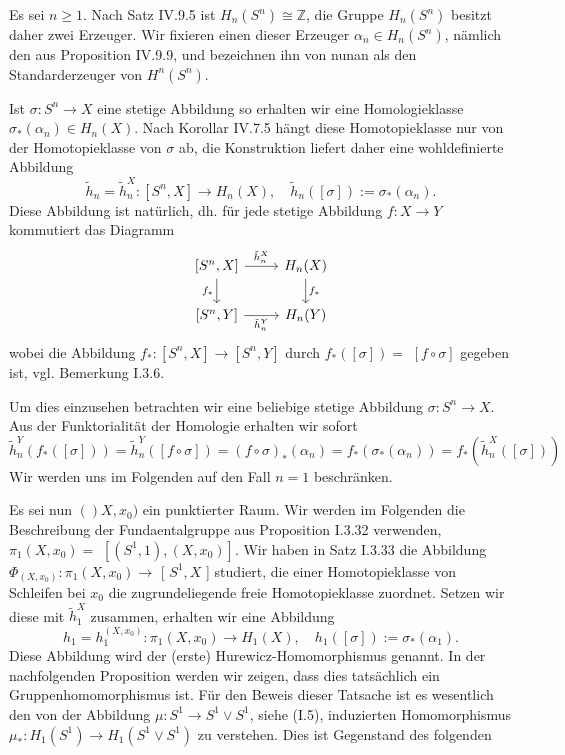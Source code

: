 \documentclass[10pt, letterpaper]{article}
\begin{document}
Es sei $n \geq 1$. Nach Satz IV.9.5 ist $H_n\left(S^n\right) \cong \mathbb{Z}$, die Gruppe $H_n\left(S^n\right)$ besitzt daher zwei Erzeuger. Wir fixieren einen dieser Erzeuger $\alpha_n \in H_n\left(S^n\right)$, nämlich den aus Proposition IV.9.9, und bezeichnen ihn von nunan als den Standarderzeuger von $H^n\left(S^n\right)$.

Ist $\sigma: S^n \rightarrow X$ eine stetige Abbildung so erhalten wir eine Homologieklasse $\sigma_*\left(\alpha_n\right) \in H_n(X)$. Nach Korollar IV.7.5 hängt diese Homotopieklasse nur von der Homotopieklasse von $\sigma$ ab, die Konstruktion liefert daher eine wohldefinierte Abbildung
$$
\tilde{h}_n=\tilde{h}_n^X:\left[S^n, X\right] \rightarrow H_n(X), \quad \tilde{h}_n([\sigma]):=\sigma_*\left(\alpha_n\right) .
$$
Diese Abbildung ist natürlich, dh. für jede stetige Abbildung $f: X \rightarrow Y$ kommutiert das Diagramm
\[
\begin{tikzcd}
{[S^n, X]} \arrow[r, "\tilde{h}_n^X"] \arrow[d, "f_*"'] & H_n(X) \arrow[d, "f_*"] \\
{[S^n, Y]} \arrow[r, "\tilde{h}_n^Y"'] & H_n(Y)
\end{tikzcd}
\]
wobei die Abbildung $f_*:\left[S^n, X\right] \rightarrow\left[S^n, Y\right]$ durch $f_*([\sigma])=$ $[f \circ \sigma]$ gegeben ist, vgl. Bemerkung I.3.6. 

Um dies einzusehen betrachten wir eine beliebige stetige Abbildung $\sigma: S^n \rightarrow X$. Aus der Funktorialität der Homologie erhalten wir sofort 
$$\tilde{h}_n^Y\left(f_*([\sigma])\right)=\tilde{h}_n^Y([f \circ \sigma])=(f \circ \sigma)_*\left(\alpha_n\right)=f_*\left(\sigma_*\left(\alpha_n\right)\right)=f_*\left(\tilde{h}_n^X([\sigma])\right)$$ 
Wir werden uns im Folgenden auf den Fall $n=1$ beschränken.

Es sei nun $()X, x_0)$ ein punktierter Raum. Wir werden im Folgenden die Beschreibung der Fundaentalgruppe aus Proposition I.3.32 verwenden, $\pi_1\left(X, x_0\right)=$ $\left[\left(S^1, 1\right),\left(X, x_0\right)\right]$. Wir haben in Satz I.3.33 die Abbildung $\Phi_{\left(X, x_0\right)}: \pi_1\left(X, x_0\right) \rightarrow$ [ $S^1, X$ ] studiert, die einer Homotopieklasse von Schleifen bei $x_0$ die zugrundeliegende freie Homotopieklasse zuordnet. Setzen wir diese mit $\tilde{h}_1^X$ zusammen, erhalten wir eine Abbildung
$$
h_1=h_1^{\left(X, x_0\right)}: \pi_1\left(X, x_0\right) \rightarrow H_1(X), \quad h_1([\sigma]):=\sigma_*\left(\alpha_1\right) .
$$
Diese Abbildung wird der (erste) Hurewicz-Homomorphismus genannt. In der nachfolgenden Proposition werden wir zeigen, dass dies tatsächlich ein Gruppenhomomorphismus ist. Für den Beweis dieser Tatsache ist es wesentlich den von der Abbildung $\mu: S^1 \rightarrow S^1 \vee S^1$, siehe (I.5), induzierten Homomorphismus $\mu_*: H_1\left(S^1\right) \rightarrow H_1\left(S^1 \vee S^1\right)$ zu verstehen. Dies ist Gegenstand des folgenden
\end{document}

